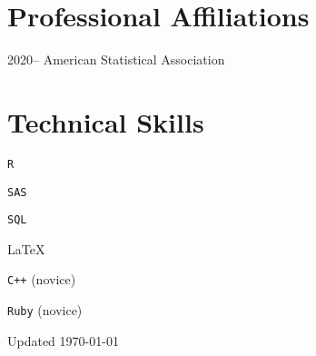 \documentclass[12pt,letterpaper]{report}
\newcommand{\listitemspace}{0.15em}
\renewenvironment{itemize}
{\begin{list}{}{\setlength{\leftmargin}{0em}
            \setlength{\parskip}{0em}
            \setlength{\itemsep}{\listitemspace}
            \setlength{\parsep}{\listitemspace}}}
    {\end{list}}
\begin{document}
    \section*{Professional Affiliations}

    \begin{tablist}

        \item[2020--] \tab American Statistical Association

    \end{tablist}

    \section*{Technical Skills}

    \begin{itemize}

        \item \texttt{R}
        
        \item \texttt{SAS}
        
        \item \texttt{SQL}
        
        \item \LaTeX
        
        \item \texttt{C++} (novice)
        
        \item \texttt{Ruby} (novice)

    \end{itemize}

    \begin{center}
        \vfill
        Updated \monthyeardate\today
    \end{center}
\end{document}
